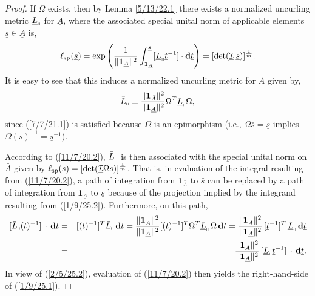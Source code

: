 \documentclass{amsart}
\numberwithin{equation}{section}
\theoremstyle{definition}
\numberwithin{theorem}{section}
\begin{document}
  \begin{proof}  
  If $\Omega$ exists, then by Lemma \ref{5/13/22.1} there exists a normalized uncurling metric $\underline{L}_{\shortparallel}$ for $\underline{A}$, where the associated special unital norm of applicable elements $\underline{s}\in \underline{A}$ is, \begin{equation}\label{1/9/25.1} \ell_{\rm sp}(\underline{s}) =    \exp\left(\frac{1}{\|\mathbf{1}_{\underline{A}}\|^2}\int_{\mathbf{1}_{\underline{A}}}^{\underline{s}} [\underline{L}_{\shortparallel}\underline{t}^{-1}]\cdot \mathbf{d}\underline{t}\right) = [\text{det}(\underline{\mathcal{I}}\, \underline{s})]^\frac{1}{m}.\end{equation}  It is easy to see that this induces a normalized uncurling metric for $\bar{A}$ given by, 
  \begin{equation}\label{1/9/25.2} \bar{L}_{\shortparallel} \equiv \frac{\|\mathbf{1}_{\bar{A}}\|^2}{\|\mathbf{1}_{\underline{A}}\|^2} \Omega^T \underline{L}_{\shortparallel} \Omega, \end{equation} since (\ref{7/7/21.1}) is satisfied because $\Omega$ is an epimorphism (i.e., $\Omega\bar{s} =  \underline{s}$ implies \mbox{$\Omega(\bar{s})^{-1} =  \underline{s}^{-1}$)}.
  
  According to (\ref{11/7/20.2}), $\bar{L}_{\shortparallel}$ is then associated with the special unital norm on $\bar{A}$ given by $\ell_{\rm sp}(\bar{s}) = [\text{det}(\underline{\mathcal{I}}\Omega\bar{s})]^{\frac{1}{m}}$.  That is, in evaluation of the integral resulting from  (\ref{11/7/20.2}), a path of integration from $\mathbf{1}_{\bar{A}}$ to $\bar{s}$ can be replaced by a path of integration from $\mathbf{1}_{\underline{A}}$ to $\underline{s}$ because of the projection implied by the integrand resulting from (\ref{1/9/25.2}).   Furthermore, on this path,
  \begin{eqnarray}\nonumber  [\bar{L}_{\shortparallel}(\bar{t})^{-1}]\,\cdot\, \mathbf{d}\bar{t} &=& [(\bar{t})^{-1}]^T \bar{L}_{\shortparallel}\,\mathbf{d}\bar{t} =  \frac{\|\mathbf{1}_{\bar{A}}\|^2}{\|\mathbf{1}_{\underline{A}}\|^2}[(\bar{t})^{-1}]^T \Omega^T \underline{L}_{\shortparallel} \, \Omega \, \mathbf{d}\bar{t}  = \frac{\|\mathbf{1}_{\bar{A}}\|^2}{\|\mathbf{1}_{\underline{A}}\|^2}\,[\underline{t}^{-1}]^T\, \underline{L}_{\shortparallel}\,\mathbf{d}\underline{t} \\ &=& \frac{\|\mathbf{1}_{\bar{A}}\|^2}{\|\mathbf{1}_{\underline{A}}\|^2}\,[\underline{L}_{\shortparallel}\underline{t}^{-1}]\,\cdot\, \mathbf{d}\underline{t}.\label{2/5/25.2}\end{eqnarray}   In view of (\ref{2/5/25.2}), evaluation of (\ref{11/7/20.2}) then yields the right-hand-side of (\ref{1/9/25.1}). 
  


\end{proof}
\end{document}

